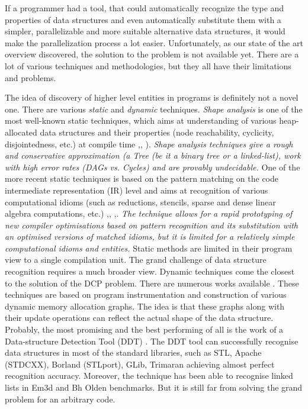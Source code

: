 \begin{description}[style=unboxed,leftmargin=0cm]
If a programmer had a tool, that could automatically recognize the type and properties of data structures and even automatically substitute them with a simpler, parallelizable and more suitable alternative data structures, it would make the parallelization process a lot easier. Unfortunately, as our state of the art overview discovered, the solution to the problem is not available yet. There are a lot of various techniques and methodologies, but they all have their limitations and problems.
\item[\textit{Limitations of "The state of the art" work}] The idea of discovery of higher level entities in programs is definitely not a novel one. There are various \textit{static} and \textit{dynamic} techniques. \textit{Shape analysis} is one of the most well-known static techniques, which aims at understanding of various heap-allocated data structures and their properties (node reachability, cyclicity, disjointedness, etc.) at compile time \cite{Sagiv:1999:PSA:292540.292552},\cite{Wilhelm:2000:SA:647476.760384}, \cite{Ghiya:1996:TDC:237721.237724}). \textit{Shape analysis techniques give a rough and conservative approximation (a \textit{Tree} (be it a binary tree or a linked-list), work with high error rates (\textit{DAGs} vs. \textit{Cycles}) and are provably undecidable.} One of the more recent static techniques is based on the pattern matching on the code intermediate representation (IR) level and aims at recognition of various computational idioms (such as reductions, stencils, sparse and dense linear algebra computations, etc.) \cite{Ginsbach:2018:CDS:3178372.3179515},\cite{Ginsbach:2017:DEG:3049832.3049862}, \cite{Ginsbach:2018:AML:3296957.3173182},\cite{Ginsbach:2018:AML:3296957.3173182}. \textit{The technique allows for a rapid prototyping of new compiler optimisations based on pattern recognition and its substitution with an optimised versions of matched idioms, but it is limited for a relatively simple computational idioms and entities.} Static methods are limited in their program view to a single compilation unit. The grand challenge of data structure recognition requires a much broader view. Dynamic techniques come the closest to the solution of the DCP problem. There are numerous works available \cite{Rupprecht:2017:DID:3155562.3155607}\cite{Haller:2016:SDS:2938006.2938029}\cite{Haller:2016:SDS:2938006.2938029}\cite{Rupprecht:2017:DID:3155562.3155607}. These techniques are based on program instrumentation and construction of various dynamic memory allocation graphs. The idea is that these graphs along with their update operations can reflect the actual shape of the data structure. Probably, the most promising and the best performing of all is the work of a Data-structure Detection Tool (DDT) \cite{1669122}. The DDT tool can successfully recognise data structures in most of the standard libraries, such as STL, Apache (STDCXX), Borland (STLport), GLib, Trimaran achieving almost perfect recognition accuracy. Moreover, the technique has been able to recognise linked lists in Em3d and Bh Olden benchmarks. But it is still far from solving the grand problem for an arbitrary code. 

\end{description}
